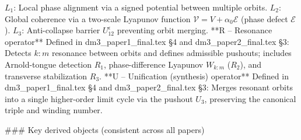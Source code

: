 $  L_1  $: Local phase alignment via a signed potential between multiple orbits.
$  L_2  $: Global coherence via a two-scale Lyapunov function $  \mathcal{V} = V + \alpha_0 \mathcal{E}  $ (phase defect $  \mathcal{E}  $).
$  L_3  $: Anti-collapse barrier $  U_{12}^\epsilon  $ preventing orbit merging.
**R – Resonance operator**
Defined in dm3_paper1_final.tex §4 and dm3_paper2_final.tex §3:
Detects $  k:m  $ resonance between orbits and defines admissible pushouts; includes Arnold-tongue detection $  R_1  $, phase-difference Lyapunov $  W_{k:m}  $ ($  R_2  $), and transverse stabilization $  R_3  $.
**U – Unification (synthesis) operator**
Defined in dm3_paper1_final.tex §4 and dm3_paper2_final.tex §3:
Merges resonant orbits into a single higher-order limit cycle via the pushout $  U_3  $, preserving the canonical triple and winding number.

### Key derived objects (consistent across all papers)

